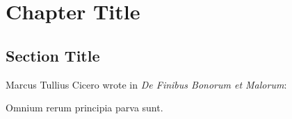 \section[chapter-title]{Chapter Title}

\subsection[section-title]{Section Title}

Marcus Tullius Cicero wrote in {\em De Finibus Bonorum et Malorum}:

\startblockquote
Omnium rerum principia parva sunt.
\stopblockquote

